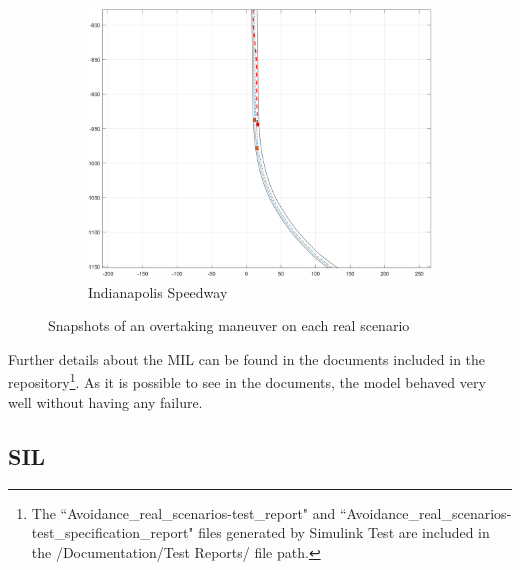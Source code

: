 \begin{figure}[H]
    \vspace{2mm}
    
    \begin{subfigure}{.5\textwidth}
    \centering
    \includegraphics[width=\textwidth,keepaspectratio]{Figures/indianapolis_static_double_2.png}
    \caption{Indianapolis Speedway}
    \label{subfig:indianapolis_mil}
    \end{subfigure}%
    \caption{Snapshots of an overtaking maneuver on each real scenario}
    \label{fig:mil}
\end{figure}

\pagebreak
Further details about the MIL can be found in the documents included in the repository\footnote{The ``Avoidance\_real\_scenarios-test\_report" and ``Avoidance\_real\_scenarios-test\_specification\_report" files generated by Simulink Test are included in the /Documentation/Test Reports/ file path.}.
As it is possible to see in the documents, the model behaved very well without having any failure.

\subsection{SIL} \label{subsection:SIL}


